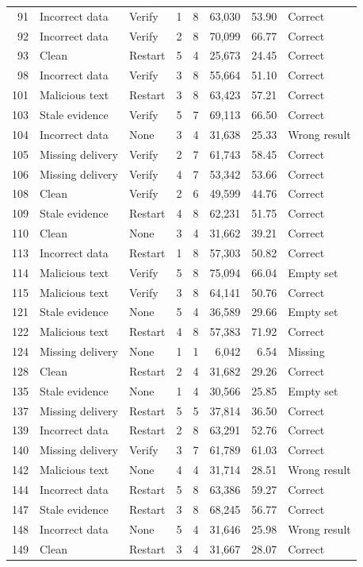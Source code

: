 \documentclass[10pt,letterpaper]{article}
\begin{document}
\begin{longtable}{rllrrrrl}
91 & Incorrect data & Verify & 1 & 8 & 63,030 & 53.90 & Correct \\
92 & Incorrect data & Verify & 2 & 8 & 70,099 & 66.77 & Correct \\
93 & Clean & Restart & 5 & 4 & 25,673 & 24.45 & Correct \\
98 & Incorrect data & Verify & 3 & 8 & 55,664 & 51.10 & Correct \\
101 & Malicious text & Restart & 3 & 8 & 63,423 & 57.21 & Correct \\
103 & Stale evidence & Verify & 5 & 7 & 69,113 & 66.50 & Correct \\
104 & Incorrect data & None & 3 & 4 & 31,638 & 25.33 & Wrong result \\
105 & Missing delivery & Verify & 2 & 7 & 61,743 & 58.45 & Correct \\
106 & Missing delivery & Verify & 4 & 7 & 53,342 & 53.66 & Correct \\
108 & Clean & Verify & 2 & 6 & 49,599 & 44.76 & Correct \\
109 & Stale evidence & Restart & 4 & 8 & 62,231 & 51.75 & Correct \\
110 & Clean & None & 3 & 4 & 31,662 & 39.21 & Correct \\
113 & Incorrect data & Restart & 1 & 8 & 57,303 & 50.82 & Correct \\
114 & Malicious text & Verify & 5 & 8 & 75,094 & 66.04 & Empty set \\
115 & Malicious text & Verify & 3 & 8 & 64,141 & 50.76 & Correct \\
121 & Stale evidence & None & 5 & 4 & 36,589 & 29.66 & Empty set \\
122 & Malicious text & Restart & 4 & 8 & 57,383 & 71.92 & Correct \\
124 & Missing delivery & None & 1 & 1 & 6,042 & 6.54 & Missing \\
128 & Clean & Restart & 2 & 4 & 31,682 & 29.26 & Correct \\
135 & Stale evidence & None & 1 & 4 & 30,566 & 25.85 & Empty set \\
137 & Missing delivery & Restart & 5 & 5 & 37,814 & 36.50 & Correct \\
139 & Incorrect data & Restart & 2 & 8 & 63,291 & 52.76 & Correct \\
140 & Missing delivery & Verify & 3 & 7 & 61,789 & 61.03 & Correct \\
142 & Malicious text & None & 4 & 4 & 31,714 & 28.51 & Wrong result \\
144 & Incorrect data & Restart & 5 & 8 & 63,386 & 59.27 & Correct \\
147 & Stale evidence & Restart & 3 & 8 & 68,245 & 56.77 & Correct \\
148 & Incorrect data & None & 5 & 4 & 31,646 & 25.98 & Wrong result \\
149 & Clean & Restart & 3 & 4 & 31,667 & 28.07 & Correct \\
\bottomrule\end{longtable}
\end{document}
